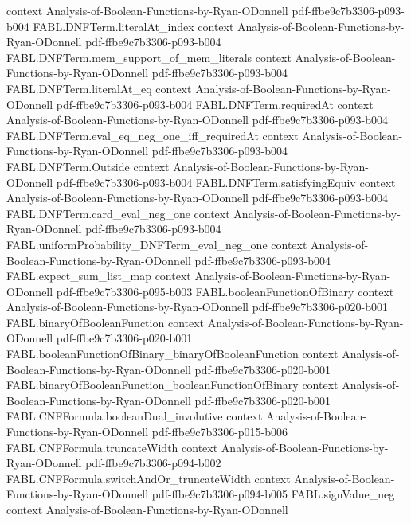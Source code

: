 \begin{theorem}
  {context}
  {Analysis-of-Boolean-Functions-by-Ryan-ODonnell}
  {pdf-ffbe9c7b3306-p093-b004}
\proofstep
  {FABL.DNFTerm.literalAt_index}
  {context}
  {Analysis-of-Boolean-Functions-by-Ryan-ODonnell}
  {pdf-ffbe9c7b3306-p093-b004}
\proofstep
  {FABL.DNFTerm.mem_support_of_mem_literals}
  {context}
  {Analysis-of-Boolean-Functions-by-Ryan-ODonnell}
  {pdf-ffbe9c7b3306-p093-b004}
\proofstep
  {FABL.DNFTerm.literalAt_eq}
  {context}
  {Analysis-of-Boolean-Functions-by-Ryan-ODonnell}
  {pdf-ffbe9c7b3306-p093-b004}
\proofstep
  {FABL.DNFTerm.requiredAt}
  {context}
  {Analysis-of-Boolean-Functions-by-Ryan-ODonnell}
  {pdf-ffbe9c7b3306-p093-b004}
\proofstep
  {FABL.DNFTerm.eval_eq_neg_one_iff_requiredAt}
  {context}
  {Analysis-of-Boolean-Functions-by-Ryan-ODonnell}
  {pdf-ffbe9c7b3306-p093-b004}
\proofstep
  {FABL.DNFTerm.Outside}
  {context}
  {Analysis-of-Boolean-Functions-by-Ryan-ODonnell}
  {pdf-ffbe9c7b3306-p093-b004}
\proofstep
  {FABL.DNFTerm.satisfyingEquiv}
  {context}
  {Analysis-of-Boolean-Functions-by-Ryan-ODonnell}
  {pdf-ffbe9c7b3306-p093-b004}
\proofstep
  {FABL.DNFTerm.card_eval_neg_one}
  {context}
  {Analysis-of-Boolean-Functions-by-Ryan-ODonnell}
  {pdf-ffbe9c7b3306-p093-b004}
\proofstep
  {FABL.uniformProbability_DNFTerm_eval_neg_one}
  {context}
  {Analysis-of-Boolean-Functions-by-Ryan-ODonnell}
  {pdf-ffbe9c7b3306-p093-b004}
\proofstep
  {FABL.expect_sum_list_map}
  {context}
  {Analysis-of-Boolean-Functions-by-Ryan-ODonnell}
  {pdf-ffbe9c7b3306-p095-b003}
\proofstep
  {FABL.booleanFunctionOfBinary}
  {context}
  {Analysis-of-Boolean-Functions-by-Ryan-ODonnell}
  {pdf-ffbe9c7b3306-p020-b001}
\proofstep
  {FABL.binaryOfBooleanFunction}
  {context}
  {Analysis-of-Boolean-Functions-by-Ryan-ODonnell}
  {pdf-ffbe9c7b3306-p020-b001}
\proofstep
  {FABL.booleanFunctionOfBinary_binaryOfBooleanFunction}
  {context}
  {Analysis-of-Boolean-Functions-by-Ryan-ODonnell}
  {pdf-ffbe9c7b3306-p020-b001}
\proofstep
  {FABL.binaryOfBooleanFunction_booleanFunctionOfBinary}
  {context}
  {Analysis-of-Boolean-Functions-by-Ryan-ODonnell}
  {pdf-ffbe9c7b3306-p020-b001}
\proofstep
  {FABL.CNFFormula.booleanDual_involutive}
  {context}
  {Analysis-of-Boolean-Functions-by-Ryan-ODonnell}
  {pdf-ffbe9c7b3306-p015-b006}
\proofstep
  {FABL.CNFFormula.truncateWidth}
  {context}
  {Analysis-of-Boolean-Functions-by-Ryan-ODonnell}
  {pdf-ffbe9c7b3306-p094-b002}
\proofstep
  {FABL.CNFFormula.switchAndOr_truncateWidth}
  {context}
  {Analysis-of-Boolean-Functions-by-Ryan-ODonnell}
  {pdf-ffbe9c7b3306-p094-b005}
\proofstep
  {FABL.signValue_neg}
  {context}
  {Analysis-of-Boolean-Functions-by-Ryan-ODonnell}

\end{theorem}
